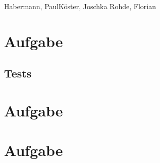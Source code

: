 \documentclass{ti2}
\begin{document}

%
                {Habermann, Paul}{K\"{o}ster, Joschka}%
                {Rohde, Florian}{}%


\section{Aufgabe}

\clearpage
\subsection{Tests}

\clearpage
\section{Aufgabe}

\clearpage
\section{Aufgabe}
\end{document}
